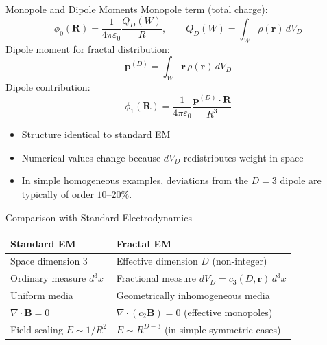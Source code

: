\documentclass[11pt]{beamer}
\begin{document}
\begin{frame}{Monopole and Dipole Moments}
Monopole term (total charge):
\begin{equation*}
  \phi_0(\bm R) = \frac{1}{4\pi \varepsilon_0} \frac{Q_D(W)}{R}, \qquad
  Q_D(W) = \int_W \rho(\bm r)\, dV_D
\end{equation*}
Dipole moment for fractal distribution:
\begin{equation*}
  \bm p^{(D)} = \int_W \bm r\, \rho(\bm r)\, dV_D
\end{equation*}
Dipole contribution:
\begin{equation*}
  \phi_1(\bm R) = \frac{1}{4\pi \varepsilon_0}
  \frac{\bm p^{(D)} \cdot \bm R}{R^3}
\end{equation*}
\begin{itemize}
  \item Structure identical to standard EM
  \item Numerical values change because $dV_D$ redistributes weight in space
  \item In simple homogeneous examples, deviations from the $D=3$ dipole are typically of order $10\text{--}20\%$.
\end{itemize}
\end{frame}

\begin{frame}{Comparison with Standard Electrodynamics}
\begin{center}
\begin{tabular}{l|l}
\textbf{Standard EM} & \textbf{Fractal EM} \\\hline
Space dimension $3$ & Effective dimension $D$ (non-integer) \\
Ordinary measure $d^3x$ & Fractional measure $dV_D = c_3(D,\bm r)\, d^3x$ \\
Uniform media & Geometrically inhomogeneous media \\
$\nabla \cdot \bm B = 0$ & $\nabla \cdot (c_2 \bm B) = 0$ (effective monopoles) \\
Field scaling $E \sim 1/R^2$ & $E \sim R^{D-3}$ (in simple symmetric cases)
\end{tabular}
\end{center}
\end{frame}
\end{document}
